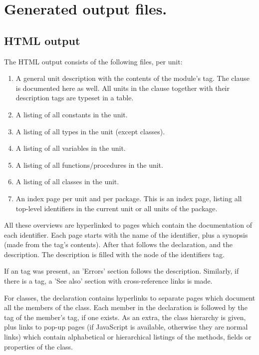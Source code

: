 \chapter{Generated output files.}
\label{ch:outputfiles}

\section{HTML output}
The HTML output consists of the following files, per unit:

\begin{enumerate}
\item A general unit description with the contents of the module's
  tag. The  clause is documented here as well. 
All units in the  clause together with their 
 description tags are typeset in a table.
\item A listing of all constants in the unit.
\item A listing of all types in the unit (except classes).
\item A listing of all variables in the unit.
\item A listing of all functions/procedures in the unit.
\item A listing of all classes in the unit.
\item An index page per unit and per package. This is an index page, listing
all top-level identifiers in the current unit or all units of the package.
\end{enumerate}
All these overviews are hyperlinked to pages which contain the documentation
of each identifier. Each page starts with the name of the identifier,
plus a synopsis (made from the  tag's contents).  After that
follows the declaration, and the description. The description is filled with
the  node of the identifiers  tag.

If an  tag was present, an 'Errors' section follows the
description. Similarly, if there is a  tag, a 'See also'
section with cross-reference links is made.

For classes, the declaration contains hyperlinks to separate pages which 
document all the members of the class. Each member in the declaration is 
followed by the  tag of the member's  tag, if one
exists. As an extra, the class hierarchy is given, plus links to pop-up pages
(if JavaScript is available, otherwise they are normal links) which contain
alphabetical or hierarchical listings of the methods, fields or properties
of the class.

